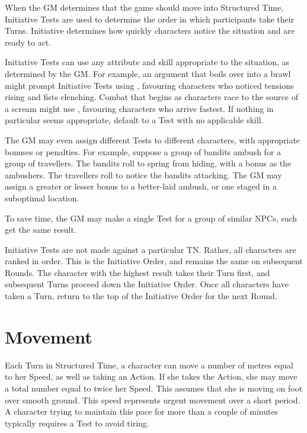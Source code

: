 When the GM determines that the game should move into Structured Time, Initiative Tests are used to determine the order in which participants take their Turns.
Initiative determines how quickly characters notice the situation and are ready to act.

Initiative Tests can use any attribute and skill appropriate to the situation, as determined by the GM.
For example, an argument that boils over into a brawl might prompt Initiative Tests using , favouring characters who noticed tensions rising and fists clenching.
Combat that begins as characters race to the source of a scream might use , favouring characters who arrive fastest.
If nothing in particular seems appropriate, default to a  Test with no applicable skill.

The GM may even assign different Tests to different characters, with appropriate bonuses or penalties.
For example, suppose a group of bandits ambush for a group of travellers.
The bandits roll  to spring from hiding, with a  bonus as the ambushers.
The travellers roll  to notice the bandits attacking.
The GM may assign a greater or lesser bonus to a better-laid ambush, or one staged in a suboptimal location.

To save time, the GM may make a single Test for a group of similar NPCs, such get the same result.

Initiative Tests are not made against a particular TN.
Rather, all characters are ranked in order.
This is the Initiative Order, and remains the same on subsequent Rounds.
The character with the highest result takes their Turn first, and subsequent Turns proceed down the Initiative Order.
Once all characters have taken a Turn, return to the top of the Initiative Order for the next Round.

\section{Movement}

Each Turn in Structured Time, a character can move a number of metres equal to her Speed, as well as taking an Action.
If she takes the  Action, she may move a total number equal to twice her Speed.
This assumes that she is moving on foot over smooth ground.
This speed represents urgent movement over a short period.
A character trying to maintain this pace for more than a couple of minutes typically requires a  Test to avoid tiring.

